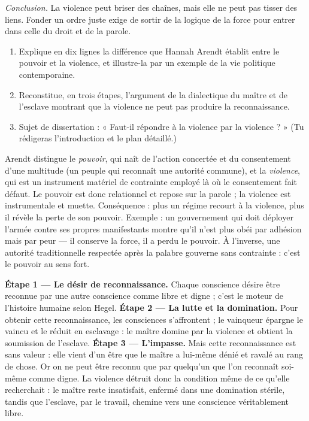 \documentclass[11pt]{article}
\begin{document}
\begin{exoresolu}
\emph{Conclusion.} La violence peut briser des chaînes, mais elle ne peut pas tisser des liens. Fonder un ordre juste exige de sortir de la logique de la force pour entrer dans celle du droit et de la parole.
\end{exoresolu}

\begin{exercice}
\begin{enumerate}
\item Explique en dix lignes la différence que Hannah Arendt établit entre le pouvoir et la violence, et illustre-la par un exemple de la vie politique contemporaine.
\item Reconstitue, en trois étapes, l'argument de la dialectique du maître et de l'esclave montrant que la violence ne peut pas produire la reconnaissance.
\item Sujet de dissertation : « Faut-il répondre à la violence par la violence ? » (Tu rédigeras l'introduction et le plan détaillé.)
\end{enumerate}
\end{exercice}

\begin{corrige}[Exercice 1]
Arendt distingue le \emph{pouvoir}, qui naît de l'action concertée et du consentement d'une multitude (un peuple qui reconnaît une autorité commune), et la \emph{violence}, qui est un instrument matériel de contrainte employé là où le consentement fait défaut. Le pouvoir est donc relationnel et repose sur la parole ; la violence est instrumentale et muette. Conséquence : plus un régime recourt à la violence, plus il révèle la perte de son pouvoir. Exemple : un gouvernement qui doit déployer l'armée contre ses propres manifestants montre qu'il n'est plus obéi par adhésion mais par peur — il conserve la force, il a perdu le pouvoir. À l'inverse, une autorité traditionnelle respectée après la palabre gouverne sans contrainte : c'est le pouvoir au sens fort.
\end{corrige}

\begin{corrige}[Exercice 2]
\textbf{Étape 1 — Le désir de reconnaissance.} Chaque conscience désire être reconnue par une autre conscience comme libre et digne ; c'est le moteur de l'histoire humaine selon Hegel. \textbf{Étape 2 — La lutte et la domination.} Pour obtenir cette reconnaissance, les consciences s'affrontent ; le vainqueur épargne le vaincu et le réduit en esclavage : le maître domine par la violence et obtient la soumission de l'esclave. \textbf{Étape 3 — L'impasse.} Mais cette reconnaissance est sans valeur : elle vient d'un être que le maître a lui-même dénié et ravalé au rang de chose. Or on ne peut être reconnu que par quelqu'un que l'on reconnaît soi-même comme digne. La violence détruit donc la condition même de ce qu'elle recherchait : le maître reste insatisfait, enfermé dans une domination stérile, tandis que l'esclave, par le travail, chemine vers une conscience véritablement libre.
\end{corrige}
\end{document}
